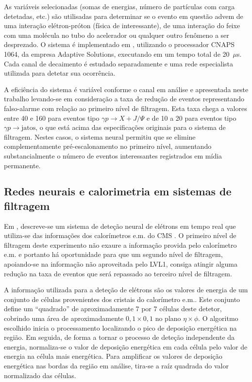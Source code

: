 As variáveis selecionadas (somas de energias, número de partículas com carga
detetadas, etc.) são utilisadas para determinar se o evento em questão advem
de uma interação elétron-próton (física de interessante), de uma interação do
feixe com uma molécula no tubo do acelerador ou qualquer outro fenômeno a ser
desprezado. O sistema é implementado em , utilizando o
processador CNAPS 1064, da empresa Adaptive Solutions, executando em um tempo
total de 20~$\mu$s. Cada canal de decaimento é estudado separadamente e uma
rede especialista utilizada para detetar sua ocorrência.

A eficiência do sistema é variável conforme o canal em análise e apresentada
neste trabalho levando-se em consideração a taxa de redução de eventos
representando falso-alarme com relação ao primeiro nível de filtragem. Esta
taxa chega a valores entre 40 e 160 para eventos tipo $\gamma p \rightarrow X
+ J/\Psi$ e de 10 a 20 para eventos tipo $\gamma p \rightarrow \text{jatos}$,
o que está acima das especificações originais para o sistema de
filtragem. Nestes casos, o sistema neural permitiu que se elimine
complementamente pré-escalonamento no primeiro nível, aumentando
substancialmente o número de eventos interessantes registrados em mídia
permanente.

\subsection{Redes neurais e calorimetria em sistemas de filtragem}

Em \cite{varela-cms-1998}, descreve-se um sistema de deteção neural de
elétrons em tempo real que utiliza-se das informações dos calorímetros e.m. do
CMS \cite{cms-trigger}. O primeiro nível de filtragem deste experimento não
exaure a informação provida pelo calorímetro e.m. e portanto há oportunidade
para que um segundo nível de filtragem, apoiando-se na informação não
aproveitada pelo LVL1, consiga atingir alguma redução na taxa de eventos que
será repassado ao terceiro nível de filtragem.

A informação utilizada para a deteção de elétrons são os valores de energia de
um conjunto de células provenientes dos cristais do calorímetro e.m.. Este
conjunto define um ``quadrado'' de aproximadamente 7 por 7 células deste
detetor, cobrindo uma área de aproximadamente $0,1 \times 0,1$ no plano $\eta
\times \phi$. O algoritmo escolhido inicia o processamento localizando o pico
de deposição energética na região. Em seguida, de forma a tornar o processo de
deteção independente da energia, normaliza-se o valor de deposição energética
em cada célula pelo valor de energia na célula mais energética. Para
amplificar os valores de deposição energética nas bordas da região em análise,
tira-se a raíz quadrada do valor normalizado das células.

